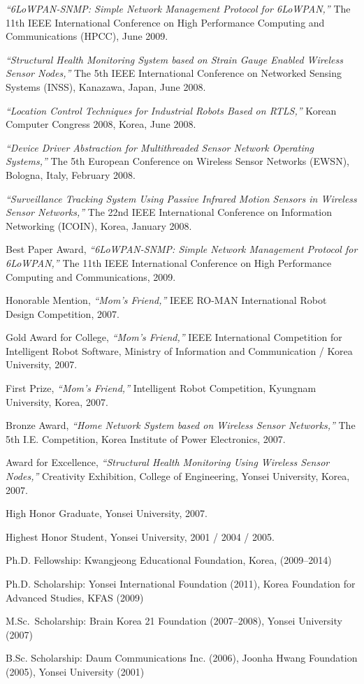 \documentclass[12pt,letterpaper]{article}
\newenvironment{itemize*}%
{\begin{itemize}%
  \setlength{\itemsep}{0pt}}%
{\end{itemize}}
\def\myvspace{\vspace{-0.22in}}
\newcommand{\mhead}[1]{\leavevmode\marginpar{\sffamily\footnotesize #1}}
\begin{document}
\medskip
\emph{``6LoWPAN-SNMP: Simple Network Management Protocol for 6LoWPAN,''} The 11th IEEE International Conference on High Performance Computing and Communications (HPCC), June 2009.

\medskip
\emph{``Structural Health Monitoring System based on Strain Gauge Enabled Wireless Sensor Nodes,''} The 5th IEEE International Conference on Networked Sensing Systems (INSS), Kanazawa, Japan, June 2008.

\medskip
\emph{``Location Control Techniques for Industrial Robots Based on RTLS,''} Korean Computer Congress 2008, Korea, June 2008.

\medskip
\emph{``Device Driver Abstraction for Multithreaded Sensor Network Operating Systems,''} The 5th European Conference on Wireless Sensor Networks (EWSN), Bologna, Italy, February 2008.

\medskip
\emph{``Surveillance Tracking System Using Passive Infrared Motion Sensors in Wireless Sensor Networks,''} The 22nd IEEE International Conference on Information Networking (ICOIN), Korea, January 2008.

\bigskip
\mhead{Awards}%
Best Paper Award, \emph{``6LoWPAN-SNMP: Simple Network Management Protocol for 6LoWPAN,''} The 11th IEEE International Conference on High Performance Computing and Communications, 2009.

\medskip
Honorable Mention, \emph{``Mom’s Friend,''} IEEE RO-MAN International Robot Design Competition, 2007.

\medskip
Gold Award for College, \emph{``Mom’s Friend,''} IEEE International Competition for Intelligent Robot Software, Ministry of Information and Communication / Korea University, 2007. 

\medskip
First Prize, \emph{``Mom’s Friend,''} Intelligent Robot Competition, Kyungnam University, Korea, 2007.

\medskip
Bronze Award, \emph{``Home Network System based on Wireless Sensor Networks,''} The 5th I.E. Competition, Korea Institute of Power Electronics, 2007.

\medskip
Award for Excellence, \emph{``Structural Health Monitoring Using Wireless Sensor Nodes,''} Creativity Exhibition, College of Engineering, Yonsei University, Korea, 2007.

\bigskip
\mhead{Honors}%
High Honor Graduate, Yonsei University, 2007.

\medskip
Highest Honor Student, Yonsei University, 2001 / 2004 / 2005.

\bigskip
\mhead{Fellowships/ Scholarships}%
\myvspace
\begin{itemize*}
  \item Ph.D. Fellowship: Kwangjeong Educational Foundation, Korea, (2009--2014)
  \item Ph.D. Scholarship: Yonsei International Foundation (2011), Korea Foundation for Advanced Studies, KFAS (2009)
  \item M.Sc.~Scholarship: Brain Korea 21 Foundation (2007--2008), Yonsei University (2007)
  \item B.Sc. Scholarship: Daum Communications Inc. (2006), Joonha Hwang Foundation (2005), Yonsei University (2001)
\end{itemize*}
\end{document}
